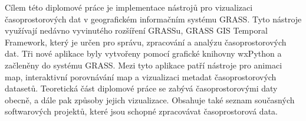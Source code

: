\begin{mtabstract}[Abstrakt]

Cílem této diplomové práce je implementace nástrojů pro vizualizaci
časo\-pros\-toro\-vých dat v geografickém informačním systému GRASS.
Tyto nástroje využívají nedávno vyvinutého rozšíření GRASSu,
GRASS GIS Temporal Framework, který je určen pro správu, zpracování a analýzu
časoprostorových dat. Tři nové aplikace byly
vytvořeny pomocí grafické knihovny wxPython a začleněny do systému GRASS.
Mezi tyto aplikace patří nástroje pro animaci map, interaktivní porovnávání map
a vizualizaci metadat časoprostorových datasetů.
Teoretická část diplomové práce se zabývá časoprostorovými daty obecně,
a dále pak způsoby jejich vizualizace. Obsahuje také seznam současných softwarových
projektů, které jsou schopné zpracovávat časoprostorová data.


\bigskip
\bigskip
\bigskip
\bigskip


\end{mtabstract}

